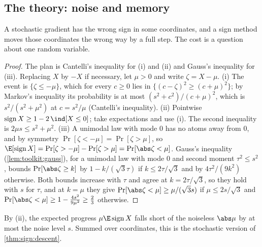 \begin{refsection}
\section{The theory: noise and memory}\label{sec:sign:noise}

A stochastic gradient has the wrong sign in some coordinates, and a sign method moves those coordinates the wrong way by a full step. The cost is a question about one random variable.


\begin{proof}
The plan is Cantelli's inequality for (i) and (ii) and Gauss's inequality for (iii). Replacing $X$ by $-X$ if necessary, let $\mu>0$ and write $\zeta=X-\mu$. (i) The event is $\{\zeta\le-\mu\}$, which for every $c\ge0$ lies in $\{(c-\zeta)^2\ge(c+\mu)^2\}$; by Markov's inequality its probability is at most $(s^2+c^2)/(c+\mu)^2$, which is $s^2/(s^2+\mu^2)$ at $c=s^2/\mu$ (Cantelli's inequality). (ii) Pointwise $\sign X\ge1-2\,\ind[X\le0]$; take expectations and use (i). The second inequality is $2\mu s\le s^2+\mu^2$. (iii) A unimodal law with mode $0$ has no atoms away from $0$, and by symmetry $\Pr[\zeta<-\mu]=\Pr[\zeta>\mu]$, so $\E[\sign X]=\Pr[\zeta>-\mu]-\Pr[\zeta>\mu]=\Pr[\abs\zeta<\mu]$. Gauss's inequality (\cref{lem:toolkit:gauss}), for a unimodal law with mode $0$ and second moment $\tau^2\le s^2$, bounds $\Pr[\abs\zeta\ge k]$ by $1-k/(\sqrt3\tau)$ if $k\le2\tau/\sqrt3$ and by $4\tau^2/(9k^2)$ otherwise. Both bounds increase with $\tau$ and agree at $k=2\tau/\sqrt3$, so they hold with $s$ for $\tau$, and at $k=\mu$ they give $\Pr[\abs\zeta<\mu]\ge\mu/(\sqrt3s)$ if $\mu\le2s/\sqrt3$ and $\Pr[\abs\zeta<\mu]\ge1-\frac{4s^2}{9\mu^2}\ge\frac23$ otherwise.
\end{proof}

By (ii), the expected progress $\mu\E\sign X$ falls short of the noiseless $\abs\mu$ by at most the noise level $s$. Summed over coordinates, this is the stochastic version of \cref{thm:sign:descent}.


\end{refsection}
